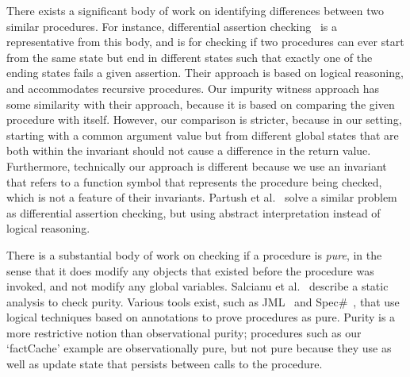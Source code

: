 There exists a significant body of work on identifying differences between
two similar procedures.  For instance, differential assertion
checking~\cite{lahiri2013differential} is a representative from this body,
and is for checking if two procedures can ever start from the same state
but end in different states such that exactly one of the ending states
fails a given assertion. Their
approach is based on logical reasoning, and accommodates recursive
procedures. Our impurity witness approach has some similarity with their
approach, because it is based on comparing the given procedure with
itself. However, our comparison is stricter, because in our setting,
starting with a common argument value but from different global states that
are both within the invariant should not cause a difference in the return
value. Furthermore, technically our approach is different because we use an
invariant that refers to a function symbol that represents the procedure
being checked, which is not a feature of their invariants. Partush et
al.~\cite{partush2013abstract} solve a similar problem as differential
assertion checking, but using abstract interpretation instead of logical
reasoning.

There is a substantial body of work on checking if a procedure is
\emph{pure}, in the sense that it does
modify any objects that existed before the procedure was invoked, and not
modify any  global variables. Salcianu et
al.~\cite{sualcianu2005purity} describe a static analysis to check purity.
Various tools exist, such as
JML~\cite{leavens2008jml} and Spec\#~\cite{barnett2004spec}, that use logical
techniques based on annotations to prove procedures as pure.  Purity is a
more restrictive notion than observational purity; procedures such
as our `factCache' example are observationally pure, but not pure because
they use as well as update state that persists between calls to the
procedure. 
